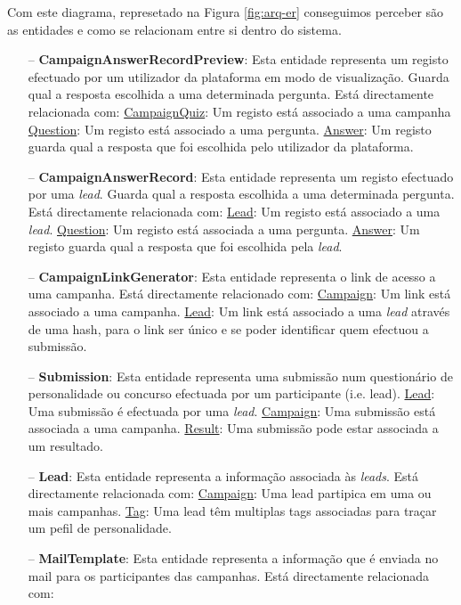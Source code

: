 Com este diagrama, represetado na Figura \ref{fig:arq-er} conseguimos perceber são as entidades e como se relacionam entre si dentro do sistema.

\begin{itemize}
	\item[--] \textbf{CampaignAnswerRecordPreview}: Esta entidade representa um registo efectuado por um utilizador da plataforma em modo de visualização. Guarda qual a resposta escolhida a uma determinada pergunta. Está directamente relacionada com:
		\subitem \underline{CampaignQuiz}: Um registo está associado a uma campanha
		\subitem \underline{Question}: Um registo está associado a uma pergunta.
		\subitem \underline{Answer}: Um registo guarda qual a resposta que foi escolhida pelo utilizador da plataforma.
	\item[--] \textbf{CampaignAnswerRecord}: Esta entidade representa um registo efectuado por uma \textit{lead}. Guarda qual a resposta escolhida a uma determinada pergunta. Está directamente relacionada com:
		\subitem \underline{Lead}: Um registo está associado a uma \textit{lead}.
		\subitem \underline{Question}: Um registo está associada a uma pergunta.
		\subitem \underline{Answer}: Um registo guarda qual a resposta que foi escolhida pela \textit{lead}.
	\item[--] \textbf{CampaignLinkGenerator}: Esta entidade representa o link de acesso a uma campanha. Está directamente relacionado com:
		\subitem \underline{Campaign}: Um link está associado a uma campanha.
		\subitem \underline{Lead}: Um link está associado a uma \textit{lead} através de uma hash, para o link ser único e se poder identificar quem efectuou a submissão.
	\item[--] \textbf{Submission}: Esta entidade representa uma submissão num questionário de personalidade ou concurso efectuada por um participante (i.e. lead).
		\subitem \underline{Lead}: Uma submissão é efectuada por uma \textit{lead}.
		\subitem \underline{Campaign}: Uma submissão está associada a uma campanha.
		\subitem \underline{Result}: Uma submissão pode estar associada a um resultado.
	\item[--] \textbf{Lead}: Esta entidade representa a informação associada às \textit{leads}. Está directamente relacionada com:
		\subitem \underline{Campaign}: Uma lead partipica em uma ou mais campanhas.
		\subitem \underline{Tag}: Uma lead têm multiplas tags associadas para traçar um pefil de personalidade.
	\item[--] \textbf{MailTemplate}: Esta entidade representa a informação que é enviada no mail para os participantes das campanhas. Está directamente relacionada com:

\end{itemize}
